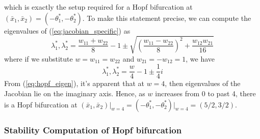 \documentclass[11pt, letterpaper]{article}
\begin{document}
which is exactly the setup required for a Hopf bifurcation at $(\bar{x}_1,\bar{x}_2)=(-\theta^\ast_1,-\theta^\ast_2)$. To make this statement precise, we can compute the eigenvalues of (\ref{eq:jacobian_specific}) as
\begin{equation*}
    \lambda^\ast_1,\lambda^\ast_2 = \frac{w_{11}+w_{22}}{8}-1\pm\sqrt{\left(  \frac{w_{11}-w_{22}}{8}\right)^2 + \frac{w_{12}w_{21}}{16}}
\end{equation*}
where if we substitute $w=w_{11}=w_{22}$ and $w_{21}=-w_{12}=1$, we have
\begin{equation}\label{eq:hopf_eigen}
    \lambda^\ast_1,\lambda^\ast_2 = \frac{w}{4}-1\pm\frac{1}{4}i
\end{equation}
From (\ref{eq:hopf_eigen}), it's apparent that at $w=4$, then eigenvalues of the Jacobian lie on the imaginary axis. Hence, as $w$ increases from 0 to past 4, there is a Hopf bifurcation at $(\bar{x}_1,\bar{x}_2)\big|_{w=4}=(-\theta^\ast_1,-\theta^\ast_2)\big|_{w=4}=\left( 5/2,3/2\right)$.

\subsubsection{Stability Computation of Hopf bifurcation}\label{sec:stability_hopf}
\end{document}
